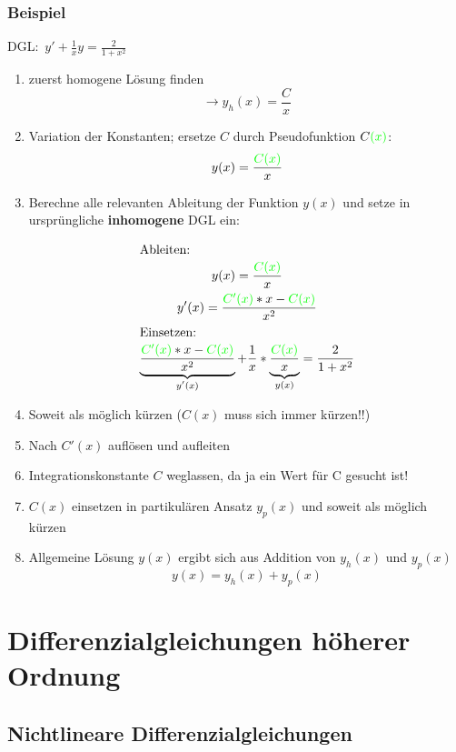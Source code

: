 \documentclass[12pt, a4paper]{scrreprt}
\begin{document}
\subsubsection{Beispiel}

DGL:\ \(y'+\frac{1}{x}y=\frac{2}{1+x^2}\)

\begin{enumerate}
\item zuerst homogene Lösung finden
  \[\rightarrow y_h(x)=\frac{C}{x}\]
\item Variation der Konstanten; ersetze \(C\) durch \glqq{} Pseudofunktion\grqq{} \(C\textcolor{green}{(x)}\):
  \[y(x)=\frac{\textcolor{green}{C(x)}}{x}\]
\item Berechne alle relevanten Ableitung der Funktion \(y(x)\) und setze in ursprüngliche \textbf{inhomogene} DGL ein:

  \begin{gather*}
    \intertext{Ableiten:}
    y(x)=\frac{\textcolor{green}{C(x)}}{x}\\
    y'(x)=\frac{\textcolor{green}{C'(x)}*x-\textcolor{green}{C(x)}}{x^2}\\
    \intertext{Einsetzen:}
    \underbrace{\frac{\textcolor{green}{C'(x)}*x-\textcolor{green}{C(x)}}{x^2}}_\text{\(y'(x)\)}+\frac{1}{x}*\underbrace{\frac{\textcolor{green}{C(x)}}{x}}_\text{\(y(x)\)}=\frac{2}{1+x^2}
  \end{gather*}

\item Soweit als möglich kürzen (\(C(x)\) muss sich immer kürzen!!)
\item Nach \(C'(x)\) auflösen und aufleiten
\item Integrationskonstante \(C\) weglassen, da ja ein Wert für C gesucht ist!
\item \(C(x)\) einsetzen in partikulären Ansatz \(y_p(x)\) und soweit als möglich kürzen
\item Allgemeine Lösung \(y(x)\) ergibt sich aus Addition von \(y_h(x)\) und \(y_p(x)\)
  \[y(x)=y_h(x)+y_p(x)\]
  
\end{enumerate}
\section{Differenzialgleichungen höherer Ordnung}
\subsection{Nichtlineare Differenzialgleichungen}
\end{document}
